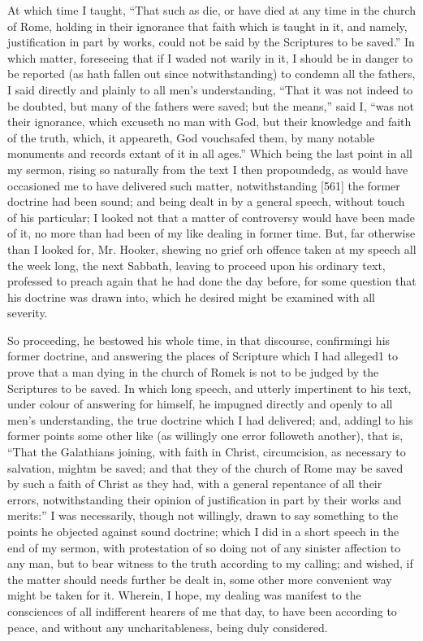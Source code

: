 At which time I taught, “That such as die, or have died at any time in the church of Rome, holding in their ignorance that faith which is taught in it, and namely, justification in part by works, could not be said by the Scriptures to be saved.” In which matter, foreseeing that if I waded not warily in it, I should be in danger to be reported (as hath fallen out since notwithstanding) to condemn all the fathers, I said directly and plainly to all men’s understanding, “That it was not indeed to be doubted, but many of the fathers were saved; but the means,” said I, “was not their ignorance, which excuseth no man with God, but their knowledge and faith of the truth, which, it appeareth, God vouchsafed them, by many notable monuments and records extant of it in all ages.” Which being the last point in all my sermon, rising so naturally from the text I then propoundedg, as would have occasioned me to have delivered such matter, notwithstanding [561] the former doctrine had been sound; and being dealt in by a general speech, without touch of his particular; I looked not that a matter of controversy would have been made of it, no more than had been of my like dealing in former time. But, far otherwise than I looked for, Mr. Hooker, shewing no grief orh offence taken at my speech all the week long, the next Sabbath, leaving to proceed upon his ordinary text, professed to preach again that he had done the day before, for some question that his doctrine was drawn into, which he desired might be examined with all severity.

So proceeding, he bestowed his whole time, in that discourse, confirmingi his former doctrine, and answering the places of Scripture which I had alleged1 to prove that a man dying in the church of Romek is not to be judged by the Scriptures to be saved. In which long speech, and utterly impertinent to his text, under colour of answering for himself, he impugned directly and openly to all men’s understanding, the true doctrine which I had delivered; and, addingl to his former points some other like (as willingly one error followeth another), that is, “That the Galathians joining, with faith in Christ, circumcision, as necessary to salvation, mightm be saved; and that they of the church of Rome may be saved by such a faith of Christ as they had, with a general repentance of all their errors, notwithstanding their opinion of justification in part by their works and merits:” I was necessarily, though not willingly, drawn to say something to the points he objected against sound doctrine; which I did in a short speech in the end of my sermon, with protestation of so doing not of any sinister affection to any man, but to bear witness to the truth according to my calling; and wished, if the matter should needs further be dealt in, some other more convenient way might be taken for it. Wherein, I hope, my dealing was manifest to the consciences of all indifferent hearers of me that day, to have been according to peace, and without any uncharitableness, being duly considered.

